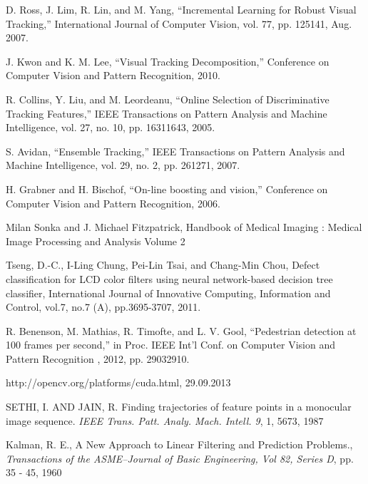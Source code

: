 \begin{thebibliography}{SMAT}
D. Ross, J. Lim, R. Lin, and M. Yang, \textquotedblleft{}Incremental Learning for Robust Visual Tracking,\textquotedblright{} International Journal of Computer Vision, vol. 77, pp. 125\textendash{}141, Aug. 2007.

J. Kwon and K. M. Lee, \textquotedblleft{}Visual Tracking Decomposition,\textquotedblright{} Conference on Computer Vision and Pattern Recognition, 2010.

R. Collins, Y. Liu, and M. Leordeanu, \textquotedblleft{}Online Selection of Discriminative Tracking Features,\textquotedblright{} IEEE Transactions on Pattern Analysis and Machine Intelligence, vol. 27, no. 10, pp. 1631\textendash{}1643, 2005.

S. Avidan, \textquotedblleft{}Ensemble Tracking,\textquotedblright{} IEEE Transactions on Pattern Analysis and Machine Intelligence, vol. 29, no. 2, pp. 261\textendash{}271, 2007.

H. Grabner and H. Bischof, \textquotedblleft{}On-line boosting and vision,\textquotedblright{} Conference on Computer Vision and Pattern Recognition, 2006.

Milan Sonka and J. Michael Fitzpatrick, Handbook of Medical Imaging : Medical Image Processing and Analysis Volume 2

Tseng, D.-C., I-Ling Chung, Pei-Lin Tsai, and Chang-Min Chou, \textquotedbl{}Defect classification for LCD color filters using neural network-based decision tree classifier,\textquotedbl{} International Journal of Innovative Computing, Information and Control, vol.7, no.7 (A), pp.3695-3707, 2011.

R. Benenson, M. Mathias, R. Timofte, and L. V. Gool, \textquotedblleft{}Pedestrian detection at 100 frames per second,\textquotedblright{} in Proc. IEEE Int\textquoteright{}l Conf. on Computer Vision and Pattern Recognition , 2012, pp. 2903\textendash{}2910.

http://opencv.org/platforms/cuda.html, 29.09.2013

SETHI, I. AND JAIN, R. Finding trajectories of feature points in a monocular image sequence. \textit{IEEE Trans. Patt. Analy. Mach. Intell. 9}, 1, 56\textendash{}73, 1987

Kalman, R. E., A New Approach to Linear Filtering and Prediction Problems., \textit{Transactions of the ASME--Journal of Basic Engineering, Vol 82, Series D}, pp. 35 - 45, 1960


\end{thebibliography}
